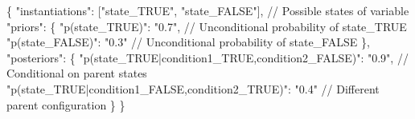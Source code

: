 \documentclass[
  11pt,
  letterpaper,
]{book}
\newenvironment{Shaded}{\begin{snugshade}}{\end{snugshade}}
\newcommand{\DataTypeTok}[1]{\textcolor[rgb]{0.68,0.00,0.00}{#1}}
\newcommand{\ErrorTok}[1]{\textcolor[rgb]{0.68,0.00,0.00}{#1}}
\newcommand{\FunctionTok}[1]{\textcolor[rgb]{0.28,0.35,0.67}{#1}}
\newcommand{\OtherTok}[1]{\textcolor[rgb]{0.00,0.23,0.31}{#1}}
\newcommand{\StringTok}[1]{\textcolor[rgb]{0.13,0.47,0.30}{#1}}
\begin{document}
\begin{Shaded}
\begin{Highlighting}[]
\FunctionTok{\{}
  \DataTypeTok{"instantiations"}\FunctionTok{:} \OtherTok{[}\StringTok{"state\_TRUE"}\OtherTok{,} \StringTok{"state\_FALSE"}\OtherTok{]}\FunctionTok{,}  \ErrorTok{//} \ErrorTok{Possible} \ErrorTok{states} \ErrorTok{of} \ErrorTok{variable}
  \DataTypeTok{"priors"}\FunctionTok{:} \FunctionTok{\{}
    \DataTypeTok{"p(state\_TRUE)"}\FunctionTok{:} \StringTok{"0.7"}\FunctionTok{,}   \ErrorTok{//} \ErrorTok{Unconditional} \ErrorTok{probability} \ErrorTok{of} \ErrorTok{state\_TRUE}
    \DataTypeTok{"p(state\_FALSE)"}\FunctionTok{:} \StringTok{"0.3"}   \ErrorTok{//} \ErrorTok{Unconditional} \ErrorTok{probability} \ErrorTok{of} \ErrorTok{state\_FALSE}
  \FunctionTok{\},}
  \DataTypeTok{"posteriors"}\FunctionTok{:} \FunctionTok{\{}
    \DataTypeTok{"p(state\_TRUE|condition1\_TRUE,condition2\_FALSE)"}\FunctionTok{:} \StringTok{"0.9"}\FunctionTok{,}  \ErrorTok{//} \ErrorTok{Conditional} \ErrorTok{on} \ErrorTok{parent} \ErrorTok{states}
    \DataTypeTok{"p(state\_TRUE|condition1\_FALSE,condition2\_TRUE)"}\FunctionTok{:} \StringTok{"0.4"}   \ErrorTok{//} \ErrorTok{Different} \ErrorTok{parent} \ErrorTok{configuration}
  \FunctionTok{\}}
\FunctionTok{\}}


\end{Highlighting}
\end{Shaded}
\end{document}
